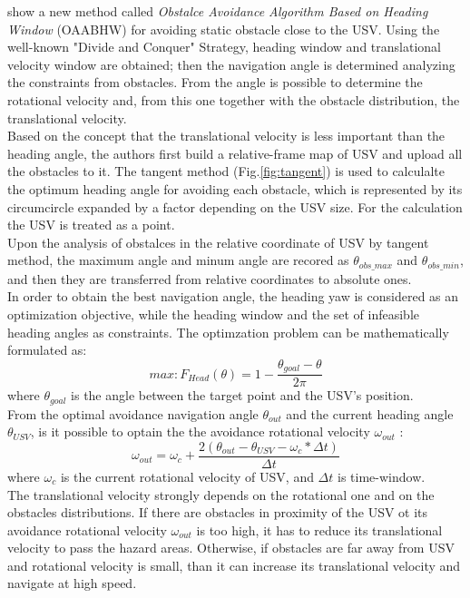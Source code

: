 \documentclass[12pt]{article}
\begin{document}
              \textcite{Tang2012} show a new method called \textit{Obstalce Avoidance Algorithm Based on Heading Window} (OAABHW) for avoiding static obstacle close to the USV. Using the well-known "Divide and Conquer" Strategy, heading window and translational velocity window are obtained; then the navigation angle is determined analyzing the constraints from obstacles. From the angle is possible to determine the rotational velocity and, from this one together with the obstacle distribution, the translational velocity.\\
              Based on the concept that the translational velocity is less important than the heading angle, the authors first build a relative-frame map of USV and upload all the obstacles to it. The tangent method (Fig.\ref{fig:tangent}) is used to calculalte the optimum heading angle for avoiding each obstacle, which is represented by its circumcircle expanded by a factor depending on the USV size. For the calculation the USV is treated as a point.\\
              Upon the analysis of obstalces in the relative coordinate of USV by tangent method, the maximum angle and minum angle are recored as $\theta_{obs\_max}$ and $\theta_{obs\_min}$, and then they are transferred from relative coordinates to absolute ones.\\
              In order to obtain the best navigation angle, the heading yaw is considered as an optimization objective, while the heading window and the set of infeasible heading angles as constraints. The optimzation problem can be mathematically formulated as:
                  \begin{equation}
                        max: F_{Head} (\theta) = 1 - \frac{\theta_{goal} - \theta}{2\pi}
                  \end{equation}
              where $\theta_{goal}$ is the angle between the target point and the USV's position.\\
              From the optimal avoidance navigation angle $\theta_{out}$ and the current heading angle $\theta_{USV}$, is it possible to optain the the avoidance rotational velocity $\omega_{out}$ :
                  \begin{equation}
                        \omega_{out} = \omega_c + \frac{2(\theta_{out} - \theta_{USV} -\omega_c * \Delta t)}{\Delta t}
                  \end{equation}
              where $\omega_c$ is the current rotational velocity of USV, and $\Delta t$ is time-window.\\
              The translational velocity strongly depends on the rotational one and on the obstacles distributions. If there are obstacles in proximity of the USV ot its avoidance rotational velocity $\omega_{out}$ is too high, it has to reduce its translational velocity to pass the hazard areas. Otherwise, if obstacles are far away from USV and rotational velocity is small, than it can increase its translational velocity and navigate at high speed.
\end{document}
